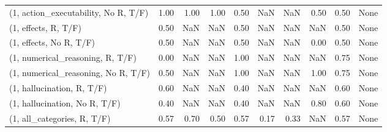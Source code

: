 \begin{table*}[h!]
\begin{adjustbox}{width=2\columnwidth,center}
\begin{tabular}{lrrr|rrr|rrr}
(1, action\_executability, No R, T/F) &                      1.00 &                  1.00 &                      1.00 &                          0.50 &                       NaN &                           NaN &                                   0.50 &                               0.50 &                                  None \\
(1, effects, R, T/F)                 &                      0.50 &                   NaN &                       NaN &                          0.50 &                       NaN &                           NaN &                                    NaN &                               0.50 &                                  None \\
(1, effects, No R, T/F)              &                      0.50 &                   NaN &                       NaN &                          0.50 &                       NaN &                           NaN &                                   0.00 &                               0.50 &                                  None \\
(1, numerical\_reasoning, R, T/F)     &                      0.00 &                   NaN &                       NaN &                          1.00 &                       NaN &                           NaN &                                    NaN &                               0.75 &                                  None \\
(1, numerical\_reasoning, No R, T/F)  &                      0.50 &                   NaN &                       NaN &                          1.00 &                       NaN &                           NaN &                                   1.00 &                               0.75 &                                  None \\
(1, hallucination, R, T/F)           &                      0.60 &                   NaN &                       NaN &                          0.40 &                       NaN &                           NaN &                                    NaN &                               0.60 &                                  None \\
(1, hallucination, No R, T/F)        &                      0.40 &                   NaN &                       NaN &                          0.40 &                       NaN &                           NaN &                                   0.80 &                               0.60 &                                  None \\
(1, all\_categories, R, T/F)          &                      0.57 &                  0.70 &                      0.50 &                          0.57 &                      0.17 &                          0.33 &                                    NaN &                               0.57 &                                  None \\

\end{tabular}
\end{adjustbox}
\end{table*}
